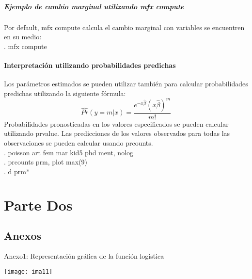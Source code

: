 \documentclass[11pt,fleqn]{book} %
\numberwithin{equation}{section} %
\numberwithin{figure}{section} %
\numberwithin{table}{section} %
\begin{document}
\subsubsection {Ejemplo de cambio marginal utilizando mfx compute}
Por default, mfx compute calcula el cambio marginal con variables se encuentren en su medio:\\
. mfx compute\\

\subsection{Interpretación utilizando probabilidades predichas}
Los parámetros estimados se pueden utilizar también para calcular probabilidades predichas utilizando la siguiente fórmula:
\begin{equation}
\widehat{Pr}(y =m| x) =\frac{{e}^{-x \widehat{\beta}}({{x \widehat{\beta}}})^{m }}{m!}
\end{equation}
Probabilidades pronosticadas en los valores especificados se pueden calcular utilizando prvalue. Las predicciones de los valores observados  para todas las observaciones se pueden calcular usando prcounts.\\
. poisson art fem mar kid5 phd ment, nolog\\
. prcounts prm, plot max(9)\\
. d prm*\\




\part{Parte Dos}




\chapter*{Anexos}

Anexo1: Representación gráfica de la función logística
\begin{center}
\texttt{[image: ima11]}
\end{center}
\end{document}
